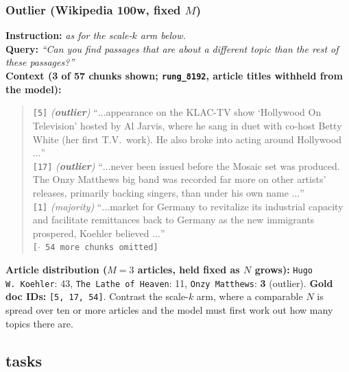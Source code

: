 \subsubsection{Outlier (Wikipedia 100w, fixed $M$)}

\textbf{Instruction:} \emph{as for the scale-$k$ arm below.}\\
\textbf{Query:} \emph{``Can you find passages that are about a different topic than the rest of these
passages?''}\\
\textbf{Context (3 of 57 chunks shown; \texttt{rung\_8192}, article titles withheld from the model):}
\begin{quote}\small
\texttt{[5]} \emph{(\textbf{outlier})} ``$\dots$appearance on the KLAC-TV show `Hollywood On
Television' hosted by Al Jarvis, where he sang in duet with co-host Betty White (her first T.V.\
work). He also broke into acting around Hollywood $\dots$''\\
\texttt{[17]} \emph{(\textbf{outlier})} ``$\dots$never been issued before the Mosaic set was produced.
The Onzy Matthews big band was recorded far more on other artists' releases, primarily backing
singers, than under his own name $\dots$''\\
\texttt{[1]} \emph{(majority)} ``$\dots$market for Germany to revitalize its industrial capacity and
facilitate remittances back to Germany as the new immigrants prospered, Koehler believed $\dots$''\\
\texttt{[$\cdot$ 54 more chunks omitted]}
\end{quote}
\textbf{Article distribution ($M{=}3$ articles, held fixed as $N$ grows):} \texttt{Hugo W.\ Koehler}:
43, \texttt{The Lathe of Heaven}: 11, \texttt{Onzy Matthews}: \textbf{3} (outlier).\quad
\textbf{Gold doc IDs:} \texttt{[5, 17, 54]}. Contrast the scale-$k$ arm, where a comparable $N$ is
spread over ten or more articles and the model must first work out how many topics there are.

\subsection{\ctc{NM} tasks}

